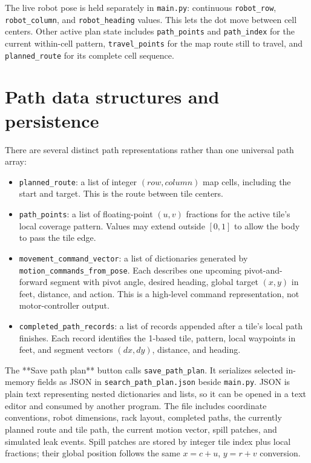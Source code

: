 \documentclass[11pt]{article}
\begin{document}
The live robot pose is held separately in \texttt{main.py}: continuous
\texttt{robot\_row}, \texttt{robot\_column}, and \texttt{robot\_heading}
values. This lets the dot move between cell centers. Other active plan state
includes \texttt{path\_points} and \texttt{path\_index} for the current
within-cell pattern, \texttt{travel\_points} for the map route still to
travel, and \texttt{planned\_route} for its complete cell sequence.

\section{Path data structures and persistence}

There are several distinct path representations rather than one universal
path array:
\begin{itemize}
  \item \texttt{planned\_route}: a list of integer $(row,column)$ map cells,
        including the start and target. This is the route between tile centers.
  \item \texttt{path\_points}: a list of floating-point $(u,v)$ fractions for
        the active tile's local coverage pattern. Values may extend outside
        $[0,1]$ to allow the body to pass the tile edge.
  \item \texttt{movement\_command\_vector}: a list of dictionaries generated
        by \texttt{motion\_commands\_from\_pose}. Each describes one upcoming
        pivot-and-forward segment with pivot angle, desired heading, global
        target $(x,y)$ in feet, distance, and action. This is a high-level
        command representation, not motor-controller output.
  \item \texttt{completed\_path\_records}: a list of records appended after a
        tile's local path finishes. Each record identifies the 1-based tile,
        pattern, local waypoints in feet, and segment vectors $(dx,dy)$,
        distance, and heading.
\end{itemize}

The **Save path plan** button calls \texttt{save\_path\_plan}. It serializes
selected in-memory fields as JSON in \texttt{search\_path\_plan.json} beside
\texttt{main.py}. JSON is plain text representing nested dictionaries and
lists, so it can be opened in a text editor and consumed by another program.
The file includes coordinate conventions, robot dimensions, rack layout,
completed paths, the currently planned route and tile path, the current motion
vector, spill patches, and simulated leak events. Spill patches are stored by
integer tile index plus local fractions; their global position follows the
same $x=c+u$, $y=r+v$ conversion.
\end{document}
